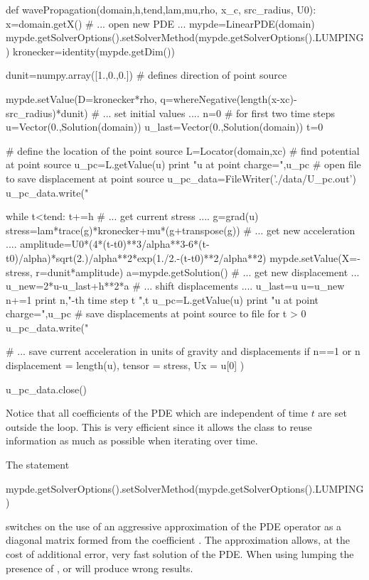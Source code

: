\begin{python}
def wavePropagation(domain,h,tend,lam,mu,rho, x_c, src_radius, U0):
   x=domain.getX()
   # ... open new PDE ...
   mypde=LinearPDE(domain)
   mypde.getSolverOptions().setSolverMethod(mypde.getSolverOptions().LUMPING)
   kronecker=identity(mypde.getDim())



   dunit=numpy.array([1.,0.,0.]) # defines direction of point source

   mypde.setValue(D=kronecker*rho, q=whereNegative(length(x-xc)-src_radius)*dunit)
   # ... set initial values ....
   n=0
   # for first two time steps
   u=Vector(0.,Solution(domain))
   u_last=Vector(0.,Solution(domain))
   t=0

   # define the location of the point source 
   L=Locator(domain,xc)
   # find potential at point source
   u_pc=L.getValue(u)
   print "u at point charge=",u_pc
   # open file to save displacement at point source
   u_pc_data=FileWriter('./data/U_pc.out')
   u_pc_data.write("%

   while t<tend:
     t+=h
     # ... get current stress ....
     g=grad(u)
     stress=lam*trace(g)*kronecker+mu*(g+transpose(g))
     # ... get new acceleration ....
     amplitude=U0*(4*(t-t0)**3/alpha**3-6*(t-t0)/alpha)*sqrt(2.)/alpha**2*exp(1./2.-(t-t0)**2/alpha**2)
     mypde.setValue(X=-stress, r=dunit*amplitude)
     a=mypde.getSolution()
     # ... get new displacement ...
     u_new=2*u-u_last+h**2*a
     # ... shift displacements ....
     u_last=u
     u=u_new
     n+=1
     print n,"-th time step t ",t
     u_pc=L.getValue(u)
     print "u at point charge=",u_pc
     # save displacements at point source to file for t > 0
     u_pc_data.write("%

     # ... save current acceleration in units of gravity and displacements 
     if n==1 or n%
     displacement = length(u), tensor = stress, Ux = u[0] )

   u_pc_data.close()
\end{python}
Notice that 
all coefficients of the PDE which are independent of time $t$ are set outside the  
loop. This is very efficient since it allows the \LinearPDE class to reuse information as much as possible 
when iterating over time. 

The statement 
\begin{python}
mypde.getSolverOptions().setSolverMethod(mypde.getSolverOptions().LUMPING) 
\end{python}
switches on the use of an aggressive approximation of the PDE operator as a diagonal matrix
formed from the coefficient .
The approximation allows, at the cost of 
additional error, very fast 
solution of the PDE. When using lumping the presence of ,  or  will produce wrong results.
 

